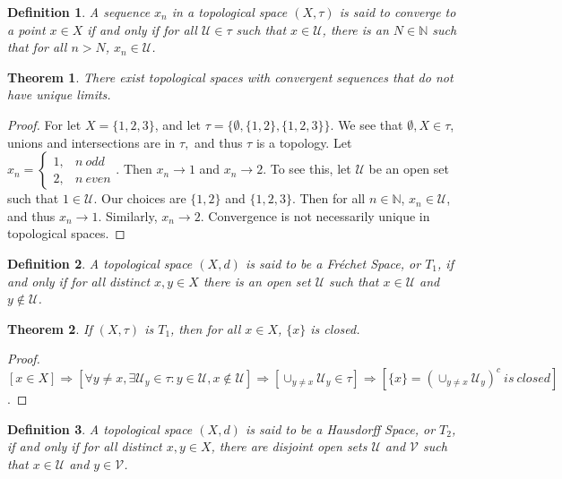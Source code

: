 \documentclass[oneside]{book}
\theoremstyle{mystyle}
\newtheorem{theorem}{Theorem}[section]
\newtheorem{definition}{Definition}[section]
\begin{document}
\begin{definition}
A sequence $x_n$ in a topological space $(X,\tau)$ is said to converge to a point $x\in X$ if and only if for all $\mathcal{U}\in \tau$ such that $x\in \mathcal{U}$, there is an $N\in \mathbb{N}$ such that for all $n>N$, $x_n \in \mathcal{U}$.
\end{definition}

\begin{theorem}
There exist topological spaces with convergent sequences that do not have unique limits.
\end{theorem}
\begin{proof}
For let $X = \{1,2,3\}$, and let $\tau = \{\emptyset, \{1,2\},\{1,2,3\}\}$. We see that $\emptyset,X\in \tau$, unions and intersections are in $\tau,$ and thus $\tau$ is a topology. Let $x_n = \begin{cases} 1, & n\ odd \\ 2, & n\ even\end{cases}$. Then $x_n \rightarrow 1$ and $x_n \rightarrow 2$. To see this, let $\mathcal{U}$ be an open set such that $1\in \mathcal{U}$. Our choices are $\{1,2\}$ and $\{1,2,3\}$. Then for all $n\in \mathbb{N}$, $x_n \in \mathcal{U}$, and thus $x_n \rightarrow 1$. Similarly, $x_n \rightarrow 2$. Convergence is not necessarily unique in topological spaces.
\end{proof}

\begin{definition}
A topological space $(X,d)$ is said to be a Fr\'{e}chet Space, or $T_1$, if and only if for all distinct $x,y\in X$ there is an open set $\mathcal{U}$ such that $x\in \mathcal{U}$ and $y\notin \mathcal{U}$.
\end{definition}

\begin{theorem}
If $(X,\tau)$ is $T_1$, then for all $x\in X$, $\{x\}$ is closed.
\end{theorem}
\begin{proof}
$[x\in X]\Rightarrow [\forall y\ne x, \exists \mathcal{U}_y\in \tau:y\in \mathcal{U},x\notin\mathcal{U}]\Rightarrow [\cup_{y\ne x}\mathcal{U}_y\in \tau]\Rightarrow [\{x\}=(\cup_{y\ne x}\mathcal{U}_y)^c\ is\ closed]$.
\end{proof}

\begin{definition}
A topological space $(X,d)$ is said to be a Hausdorff Space, or $T_2$, if and only if for all distinct $x,y\in X$, there are disjoint open sets $\mathcal{U}$ and $\mathcal{V}$ such that $x\in \mathcal{U}$ and $y\in \mathcal{V}$.
\end{definition}
\end{document}
